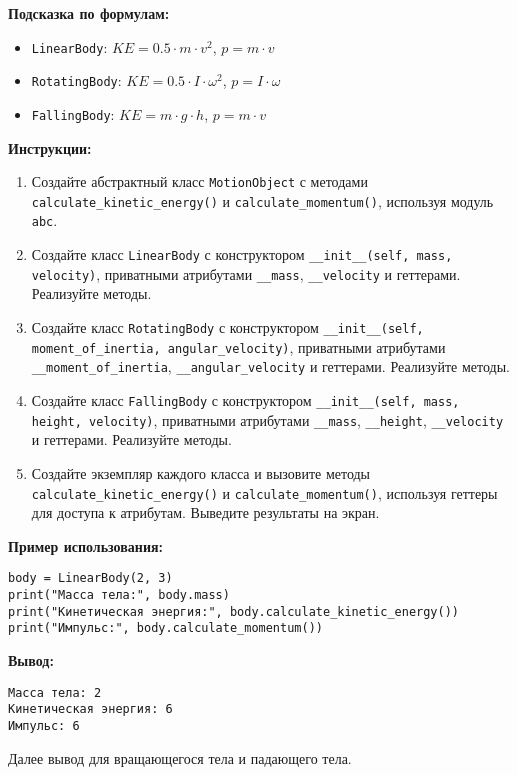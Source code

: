 \begin{enumerate}
\textbf{Подсказка по формулам:}
\begin{itemize}
    \item \texttt{LinearBody}: $KE = 0.5 \cdot m \cdot v^2$, $p = m \cdot v$
    \item \texttt{RotatingBody}: $KE = 0.5 \cdot I \cdot \omega^2$, $p = I \cdot \omega$
    \item \texttt{FallingBody}: $KE = m \cdot g \cdot h$, $p = m \cdot v$
\end{itemize}

\textbf{Инструкции:}
\begin{enumerate}
    \item Создайте абстрактный класс \texttt{MotionObject} с методами \texttt{calculate\_kinetic\_energy()} и \texttt{calculate\_momentum()}, используя модуль \texttt{abc}.
    \item Создайте класс \texttt{LinearBody} с конструктором \texttt{\_\_init\_\_(self, mass, velocity)}, приватными атрибутами \texttt{\_\_mass}, \texttt{\_\_velocity} и геттерами. Реализуйте методы.
    \item Создайте класс \texttt{RotatingBody} с конструктором \texttt{\_\_init\_\_(self, moment\_of\_inertia, angular\_velocity)}, приватными атрибутами \texttt{\_\_moment\_of\_inertia}, \texttt{\_\_angular\_velocity} и геттерами. Реализуйте методы.
    \item Создайте класс \texttt{FallingBody} с конструктором \texttt{\_\_init\_\_(self, mass, height, velocity)}, приватными атрибутами \texttt{\_\_mass}, \texttt{\_\_height}, \texttt{\_\_velocity} и геттерами. Реализуйте методы.
    \item Создайте экземпляр каждого класса и вызовите методы \texttt{calculate\_kinetic\_energy()} и \texttt{calculate\_momentum()}, используя геттеры для доступа к атрибутам. Выведите результаты на экран.
\end{enumerate}

\textbf{Пример использования:}
\begin{verbatim}
body = LinearBody(2, 3)
print("Масса тела:", body.mass)
print("Кинетическая энергия:", body.calculate_kinetic_energy())
print("Импульс:", body.calculate_momentum())
\end{verbatim}

\textbf{Вывод:}
\begin{verbatim}
Масса тела: 2
Кинетическая энергия: 6
Импульс: 6
\end{verbatim}

Далее вывод для вращающегося тела и падающего тела.


\end{enumerate}
